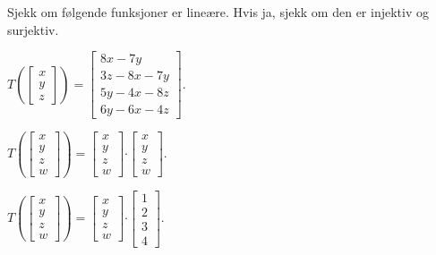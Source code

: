 

\begin{oppgave}
Sjekk om følgende funksjoner er lineære. Hvis ja, sjekk om den er injektiv og surjektiv.

\begin{punkt}
$T(\begin{bmatrix}
x\\
y\\
z
\end{bmatrix})=\begin{bmatrix}
8x-7y\\
3z-8x-7y\\
5y-4x-8z\\
6y-6x-4z
\end{bmatrix}.$
\end{punkt}

\begin{punkt}
$T(\begin{bmatrix}
x\\
y\\
z\\
w
\end{bmatrix})=\begin{bmatrix}
x\\
y\\
z\\
w
\end{bmatrix}\boldsymbol{\cdot }\begin{bmatrix}
x\\
y\\
z\\
w
\end{bmatrix}.$

\end{punkt}

\begin{punkt}
$T(\begin{bmatrix}
x\\
y\\
z\\
w
\end{bmatrix})=\begin{bmatrix}
x\\
y\\
z\\
w
\end{bmatrix}\boldsymbol{\cdot }\begin{bmatrix}
1\\
2\\
3\\
4
\end{bmatrix}.$


\end{punkt}
\end{oppgave}
